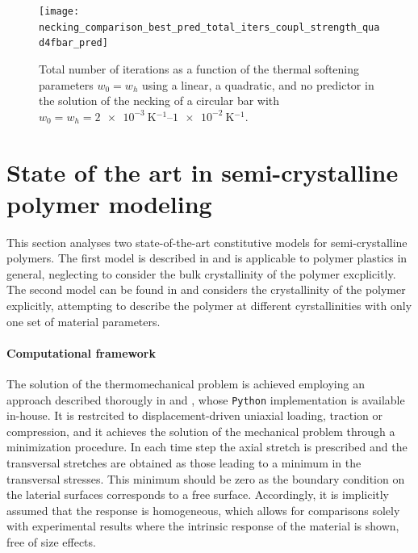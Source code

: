      \begin{figure}[!hbtp]
       \centering
       \texttt{[image: necking\_comparison\_best\_pred\_total\_iters\_coupl\_strength\_quad4fbar\_pred]}
       \caption{Total number of iterations as a function of the thermal softening parameters \(w_0=w_h\) using a linear, a quadratic, and no predictor in the solution of the necking of a circular bar with \(w_0=w_h=\SIrange{2e-3}{1e-2}{\kelvin^{-1}}\).}
       \label{fig:necking_comparison_best_pred_total_iters_coupl_strength_quad4fbar_pred}
     \end{figure}

\section{State of the art in semi-crystalline polymer modeling}

This section analyses two state-of-the-art constitutive models for semi-crystalline polymers.
The first model is described in \cite{haoUnifiedAmorphousCrystalline2022} and is applicable to polymer plastics in general, neglecting to consider the bulk crystallinity of the polymer excplicitly.
The second model can be found in \cite{abdul-hameedTwophaseHyperelasticviscoplasticConstitutive2014} and considers the crystallinity of the polymer explicitly, attempting to describe the polymer at different cyrstallinities with only one set of material parameters.

\paragraph{Computational framework}
The solution of the thermomechanical problem is achieved employing an approach described thorougly in \cite{bergstromMechanicsSolidPolymers2015} and \cite{alvesFastOptimizationbasedParameter2022}, whose \verb|Python| implementation is available in-house.
It is restrcited to displacement-driven uniaxial loading, traction or compression, and it achieves the solution of the mechanical problem through a minimization procedure.
In each time step the axial stretch is prescribed and the transversal stretches are obtained as those leading to a minimum in the transversal stresses.
This minimum should be zero as the boundary condition on the laterial surfaces corresponds to a free surface.
Accordingly, it is implicitly assumed that the response is homogeneous, which allows for comparisons solely with experimental results where the intrinsic response of the material is shown, free of size effects.

